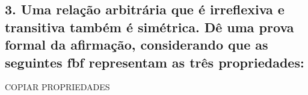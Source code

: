 \subsection*{3. Uma relação arbitrária que é irreflexiva e transitiva também é simétrica. Dê uma prova formal da afirmação, considerando que as seguintes fbf representam as três propriedades:}

COPIAR PROPRIEDADES 